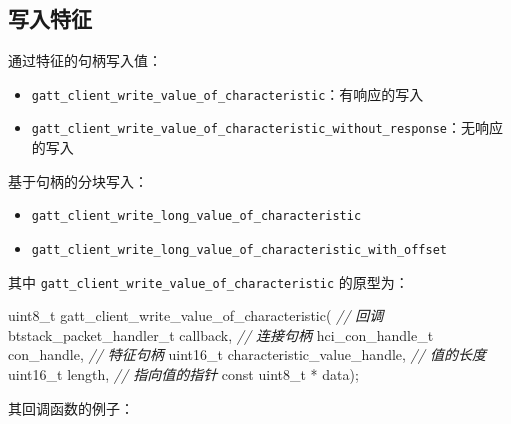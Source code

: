 \documentclass[
  12pt,
]{book}
\newenvironment{Shaded}{\begin{snugshade}}{\end{snugshade}}
\newcommand{\CommentTok}[1]{\textcolor[rgb]{0.56,0.35,0.01}{\textit{#1}}}
\newcommand{\ControlFlowTok}[1]{\textcolor[rgb]{0.13,0.29,0.53}{\textbf{#1}}}
\newcommand{\DataTypeTok}[1]{\textcolor[rgb]{0.13,0.29,0.53}{#1}}
\newcommand{\DecValTok}[1]{\textcolor[rgb]{0.00,0.00,0.81}{#1}}
\newcommand{\NormalTok}[1]{#1}
\newcommand{\SpecialCharTok}[1]{\textcolor[rgb]{0.00,0.00,0.00}{#1}}
\newcommand{\StringTok}[1]{\textcolor[rgb]{0.31,0.60,0.02}{#1}}
\providecommand{\tightlist}{%
  \setlength{\itemsep}{0pt}\setlength{\parskip}{0pt}}
\begin{document}
\hypertarget{ux5199ux5165ux7279ux5f81}{%
\subsection{写入特征}\label{ux5199ux5165ux7279ux5f81}}

通过特征的句柄写入值：

\begin{itemize}
\tightlist
\item
  \texttt{gatt\_client\_write\_value\_of\_characteristic}：有响应的写入
\item
  \texttt{gatt\_client\_write\_value\_of\_characteristic\_without\_response}：无响应的写入
\end{itemize}

基于句柄的分块写入：

\begin{itemize}
\tightlist
\item
  \texttt{gatt\_client\_write\_long\_value\_of\_characteristic}
\item
  \texttt{gatt\_client\_write\_long\_value\_of\_characteristic\_with\_offset}
\end{itemize}

其中 \texttt{gatt\_client\_write\_value\_of\_characteristic} 的原型为：

\begin{Shaded}
\begin{Highlighting}[]
\DataTypeTok{uint8_t}\NormalTok{ gatt_client_write_value_of_characteristic(}
    \CommentTok{// 回调}
\NormalTok{    btstack_packet_handler_t callback,}
    \CommentTok{// 连接句柄}
\NormalTok{    hci_con_handle_t con_handle,}
    \CommentTok{// 特征句柄}
    \DataTypeTok{uint16_t}\NormalTok{ characteristic_value_handle,}
    \CommentTok{// 值的长度}
    \DataTypeTok{uint16_t}\NormalTok{ length,}
    \CommentTok{// 指向值的指针}
    \DataTypeTok{const} \DataTypeTok{uint8_t}\NormalTok{ * data);}
\end{Highlighting}
\end{Shaded}

其回调函数的例子：

\begin{Shaded}
\end{Shaded}
\end{document}
